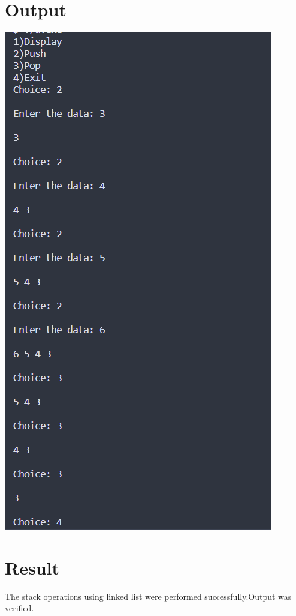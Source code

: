\section{Output}
\includegraphics[]{Cycle_2/Outputs/Stack.png}

\section{Result}
The stack operations using linked list were performed successfully.Output was verified.